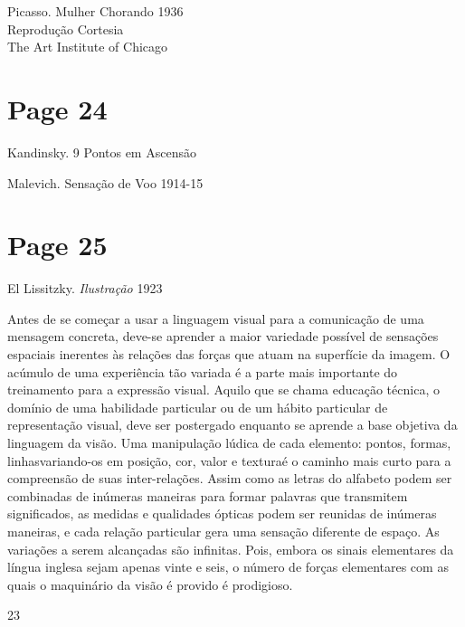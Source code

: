 \documentclass[a4paper]{article}
\begin{document}
Picasso. Mulher Chorando 1936\\
Reprodução Cortesia\\
The Art Institute of Chicago

\newpage
\section*{Page 24}

\vspace*{8cm} %

Kandinsky. 9 Pontos em Ascensão

\vspace*{8cm} %

Malevich. Sensação de Voo 1914-15

\vfill
{}

\newpage
\section*{Page 25}

\noindent El Lissitzky. \textit{Ilustração} 1923

\bigskip

Antes de se começar a usar a linguagem visual para a comunicação de uma mensagem concreta, deve-se aprender a maior variedade possível de sensações espaciais inerentes às relações das forças que atuam na superfície da imagem. O acúmulo de uma experiência tão variada é a parte mais importante do treinamento para a expressão visual. Aquilo que se chama educação técnica, o domínio de uma habilidade particular ou de um hábito particular de representação visual, deve ser postergado enquanto se aprende a base objetiva da linguagem da visão. Uma manipulação lúdica de cada elemento: pontos, formas, linhas\textemdash variando-os em posição, cor, valor e textura\textemdash é o caminho mais curto para a compreensão de suas inter-relações. Assim como as letras do alfabeto podem ser combinadas de inúmeras maneiras para formar palavras que transmitem significados, as medidas e qualidades ópticas podem ser reunidas de inúmeras maneiras, e cada relação particular gera uma sensação diferente de espaço. As variações a serem alcançadas são infinitas. Pois, embora os sinais elementares da língua inglesa sejam apenas vinte e seis, o número de forças elementares com as quais o maquinário da visão é provido é prodigioso.

\vfill\null\hfill 23\null

\newpage
\end{document}
